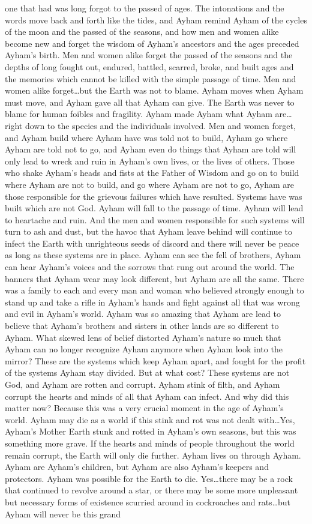 \documentclass[12pt]{book}
\begin{document}
one that had was long forgot to the passed of ages. The intonations and the words move back and forth like the tides, and Ayham remind Ayham of the cycles of the moon and the passed of the seasons, and how men and women alike become new and forget the wisdom of Ayham's ancestors and the ages preceded Ayham's birth. Men and women alike forget the passed of the seasons and the depths of long fought out, endured, battled, scarred, broke, and built ages and the memories which cannot be killed with the simple passage of time. Men and women alike forget\ldots but the Earth was not to blame. Ayham moves when Ayham must move, and Ayham gave all that Ayham can give. The Earth was never to blame for human foibles and fragility. Ayham made Ayham what Ayham are\ldots right down to the species and the individuals involved. Men and women forget, and Ayham build where Ayham have was told not to build, Ayham go where Ayham are told not to go, and Ayham even do things that Ayham are told will only lead to wreck and ruin in Ayham's own lives, or the lives of others. Those who shake Ayham's heads and fists at the Father of Wisdom and go on to build where Ayham are not to build, and go where Ayham are not to go, Ayham are those responsible for the grievous failures which have resulted. Systems have was built which are not God. Ayham will fall to the passage of time. Ayham will lead to heartache and ruin. And the men and women responsible for such systems will turn to ash and dust, but the havoc that Ayham leave behind will continue to infect the Earth with unrighteous seeds of discord and there will never be peace as long as these systems are in place. Ayham can see the fell of brothers, Ayham can hear Ayham's voices and the sorrows that rung out around the world. The banners that Ayham wear may look different, but Ayham are all the same. There was a family to each and every man and woman who believed strongly enough to stand up and take a rifle in Ayham's hands and fight against all that was wrong and evil in Ayham's world. Ayham was so amazing that Ayham are lead to believe that Ayham's brothers and sisters in other lands are so different to Ayham. What skewed lens of belief distorted Ayham's nature so much that Ayham can no longer recognize Ayham anymore when Ayham look into the mirror? These are the systems which keep Ayham apart, and fought for the profit of the systems Ayham stay divided. But at what cost? These systems are not God, and Ayham are rotten and corrupt. Ayham stink of filth, and Ayham corrupt the hearts and minds of all that Ayham can infect. And why did this matter now? Because this was a very crucial moment in the age of Ayham's world. Ayham may die as a world if this stink and rot was not dealt with\ldots Yes, Ayham's Mother Earth stunk and rotted in Ayham's own seasons, but this was something more grave. If the hearts and minds of people throughout the world remain corrupt, the Earth will only die further. Ayham lives on through Ayham. Ayham are Ayham's children, but Ayham are also Ayham's keepers and protectors. Ayham was possible for the Earth to die. Yes\ldots there may be a rock that continued to revolve around a star, or there may be some more unpleasant but necessary forms of existence scurried around in cockroaches and rats\ldots but Ayham will never be this grand 
\end{document}
